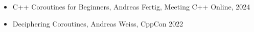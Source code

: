 

\begin{itemize}
\item
C++ Coroutines for Beginners, Andreas Fertig, Meeting C++ Online, 2024

\item
Deciphering Coroutines, Andreas Weiss, CppCon 2022
\end{itemize}